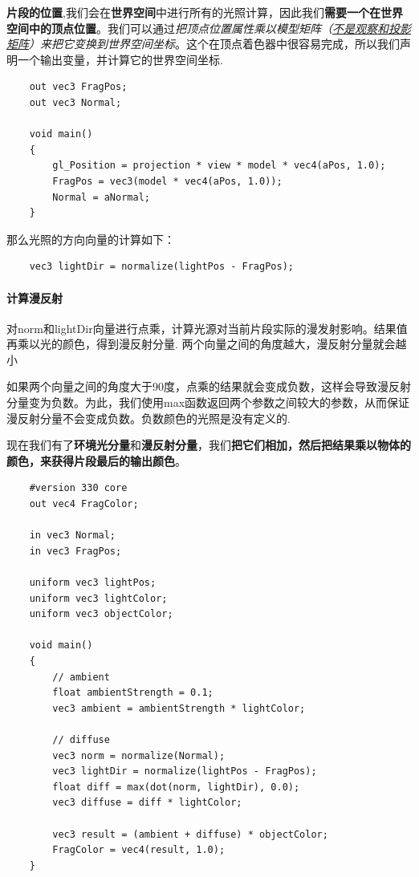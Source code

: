 \documentclass[UTF8,a4paper,12pt]{ctexbook}
\begin{document}
				\textbf{片段的位置},我们会在\textbf{世界空间}中进行所有的光照计算，因此我们\textbf{需要一个在世界空间中的顶点位置}。我们可以通过\textit{把顶点位置属性乘以模型矩阵（\underline{不是观察和投影矩阵}）来把它变换到世界空间坐标}。这个在顶点着色器中很容易完成，所以我们声明一个输出变量，并计算它的世界空间坐标.
				
				\begin{lstlisting}
	out vec3 FragPos;  
	out vec3 Normal;
	
	void main()
	{
	    gl_Position = projection * view * model * vec4(aPos, 1.0);
	    FragPos = vec3(model * vec4(aPos, 1.0));
	    Normal = aNormal;
	}				
				\end{lstlisting}
				
				 那么光照的方向向量的计算如下：
				 \begin{lstlisting}
	vec3 lightDir = normalize(lightPos - FragPos);				 
				 \end{lstlisting}
				
			\paragraph{计算漫反射}
				对norm和lightDir向量进行点乘，计算光源对当前片段实际的漫发射影响。结果值再乘以光的颜色，得到漫反射分量.
				两个向量之间的角度越大，漫反射分量就会越小
				
				如果两个向量之间的角度大于90度，点乘的结果就会变成负数，这样会导致漫反射分量变为负数。为此，我们使用max函数返回两个参数之间较大的参数，从而保证漫反射分量不会变成负数。负数颜色的光照是没有定义的.
				
				现在我们有了\textbf{环境光分量}和\textbf{漫反射分量}，我们\textbf{把它们相加，然后把结果乘以物体的颜色，来获得片段最后的输出颜色}。
				
				\begin{lstlisting}
	#version 330 core
	out vec4 FragColor;
	
	in vec3 Normal;  
	in vec3 FragPos;  
	  
	uniform vec3 lightPos; 
	uniform vec3 lightColor;
	uniform vec3 objectColor;
	
	void main()
	{
	    // ambient
	    float ambientStrength = 0.1;
	    vec3 ambient = ambientStrength * lightColor;
	  	
	    // diffuse 
	    vec3 norm = normalize(Normal);
	    vec3 lightDir = normalize(lightPos - FragPos);
	    float diff = max(dot(norm, lightDir), 0.0);
	    vec3 diffuse = diff * lightColor;
	            
	    vec3 result = (ambient + diffuse) * objectColor;
	    FragColor = vec4(result, 1.0);
	} 				
				\end{lstlisting}
			
\end{document}
